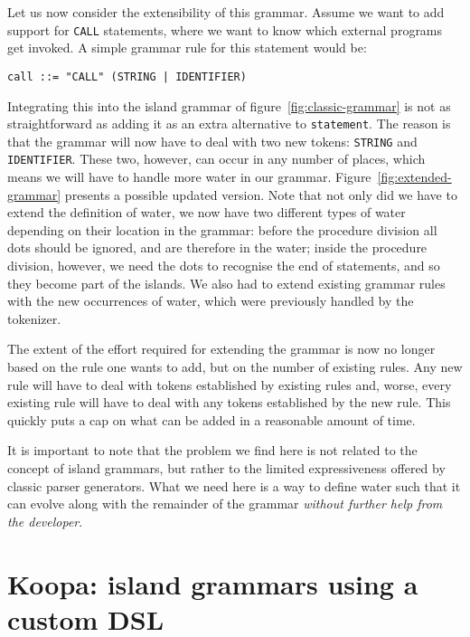 \documentclass[a4paper]{article}
\begin{document}
Let us now consider the extensibility of this grammar. Assume we want to add support for \lstinline|CALL| statements, where we want to know which external programs get invoked. A simple grammar rule for this statement would be:
\begin{lstlisting}[numbers=none]
call ::= "CALL" (STRING | IDENTIFIER)
\end{lstlisting}

Integrating this into the island grammar of figure~\ref{fig:classic-grammar} is not as straightforward as adding it as an extra alternative to \lstinline|statement|. The reason is that the grammar will now have to deal with two new tokens: \lstinline|STRING| and \lstinline|IDENTIFIER|. These two, however, can occur in any number of places, which means we will have to handle more water in our grammar. Figure~\ref{fig:extended-grammar} presents a possible updated version. Note that not only did we have to extend the definition of water, we now have two different types of water depending on their location in the grammar: before the procedure division all dots should be ignored, and are therefore in the water; inside the procedure division, however, we need the dots to recognise the end of statements, and so they become part of the islands. We also had to extend existing grammar rules with the new occurrences of water, which were previously handled by the tokenizer.

The extent of the effort required for extending the grammar is now no longer based on the rule one wants to add, but on the number of existing rules. Any new rule will have to deal with tokens established by existing rules and, worse, every existing rule will have to deal with any tokens established by the new rule. This quickly puts a cap on what can be added in a reasonable amount of time.

It is important to note that the problem we find here is not related to the concept of island grammars, but rather to the limited expressiveness offered by classic parser generators. What we need here is a way to define water such that it can evolve along with the remainder of the grammar \emph{without further help from the developer}.


\section{Koopa: island grammars using a custom DSL}
\label{koopa}
\end{document}
